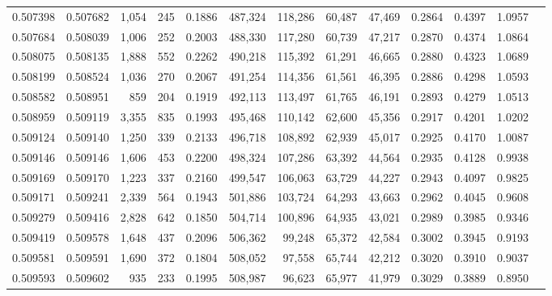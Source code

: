 \begin{tabular}{rrrrrrrrrrrrr}
0.507398 & 0.507682 & 1,054 &   245 &                                     0.1886 & 487,324 & 118,286 &  60,487 &  47,469 & 0.2864 & 0.4397 & 1.0957 \\
0.507684 & 0.508039 & 1,006 &   252 &                                     0.2003 & 488,330 & 117,280 &  60,739 &  47,217 & 0.2870 & 0.4374 & 1.0864 \\
0.508075 & 0.508135 & 1,888 &   552 &                                     0.2262 & 490,218 & 115,392 &  61,291 &  46,665 & 0.2880 & 0.4323 & 1.0689 \\
0.508199 & 0.508524 & 1,036 &   270 &                                     0.2067 & 491,254 & 114,356 &  61,561 &  46,395 & 0.2886 & 0.4298 & 1.0593 \\
0.508582 & 0.508951 &   859 &   204 &                                     0.1919 & 492,113 & 113,497 &  61,765 &  46,191 & 0.2893 & 0.4279 & 1.0513 \\
0.508959 & 0.509119 & 3,355 &   835 &                                     0.1993 & 495,468 & 110,142 &  62,600 &  45,356 & 0.2917 & 0.4201 & 1.0202 \\
0.509124 & 0.509140 & 1,250 &   339 &                                     0.2133 & 496,718 & 108,892 &  62,939 &  45,017 & 0.2925 & 0.4170 & 1.0087 \\
0.509146 & 0.509146 & 1,606 &   453 &                                     0.2200 & 498,324 & 107,286 &  63,392 &  44,564 & 0.2935 & 0.4128 & 0.9938 \\
0.509169 & 0.509170 & 1,223 &   337 &                                     0.2160 & 499,547 & 106,063 &  63,729 &  44,227 & 0.2943 & 0.4097 & 0.9825 \\
0.509171 & 0.509241 & 2,339 &   564 &                                     0.1943 & 501,886 & 103,724 &  64,293 &  43,663 & 0.2962 & 0.4045 & 0.9608 \\
0.509279 & 0.509416 & 2,828 &   642 &                                     0.1850 & 504,714 & 100,896 &  64,935 &  43,021 & 0.2989 & 0.3985 & 0.9346 \\
0.509419 & 0.509578 & 1,648 &   437 &                                     0.2096 & 506,362 &  99,248 &  65,372 &  42,584 & 0.3002 & 0.3945 & 0.9193 \\
0.509581 & 0.509591 & 1,690 &   372 &                                     0.1804 & 508,052 &  97,558 &  65,744 &  42,212 & 0.3020 & 0.3910 & 0.9037 \\
0.509593 & 0.509602 &   935 &   233 &                                     0.1995 & 508,987 &  96,623 &  65,977 &  41,979 & 0.3029 & 0.3889 & 0.8950 \\

\end{tabular}
